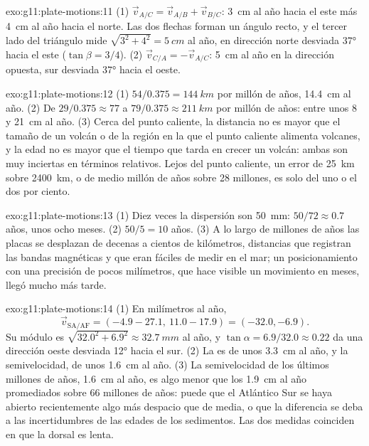 \begin{solution}{exo:g11:plate-motions:11}
(1) $\vec v_{A/C} = \vec v_{A/B} + \vec v_{B/C}$: \qty{3}{cm} al año hacia el
este más \qty{4}{cm} al año hacia el norte. Las dos flechas forman un ángulo
recto, y el tercer lado del triángulo mide $\sqrt{3^2 + 4^2} = \qty{5}{cm}$ al
año, en dirección norte desviada \ang{37} hacia el este ($\tan\beta = 3/4$).
(2) $\vec v_{C/A}
= -\vec v_{A/C}$: \qty{5}{cm} al año en la dirección opuesta, sur desviada
\ang{37} hacia el oeste.
\end{solution}

\begin{solution}{exo:g11:plate-motions:12}
(1) $54/0.375 = \qty{144}{km}$ por millón de años, \qty{14.4}{cm} al año. (2)
De $29/0.375 \approx 77$ a $79/0.375 \approx \qty{211}{km}$ por millón de
años: entre unos 8 y \qty{21}{cm} al año. (3) Cerca del punto caliente, la
distancia no es mayor que el tamaño de un volcán o de la región en la que el
punto caliente alimenta volcanes, y la edad no es mayor que el tiempo que
tarda en crecer un volcán: ambas son muy inciertas en términos relativos. Lejos
del punto caliente, un error de \qty{25}{km} sobre \qty{2400}{km}, o de medio
millón de años sobre 28 millones, es solo del uno o el dos por ciento.
\end{solution}

\begin{solution}{exo:g11:plate-motions:13}
(1) Diez veces la dispersión son \qty{50}{mm}: $50/72 \approx 0.7$ años, unos
ocho meses. (2) $50/5 = 10$ años. (3) A lo largo de millones de años las
placas se desplazan de decenas a cientos de kilómetros, distancias que
registran las bandas magnéticas y que eran fáciles de medir en el mar; un
posicionamiento con una precisión de pocos milímetros, que hace visible un
movimiento en meses, llegó mucho más tarde.
\end{solution}

\begin{solution}{exo:g11:plate-motions:14}
(1) En milímetros al año,
\[
  \vec v_{\mathrm{SA/AF}} = (-4.9 - 27.1,\ 11.0 - 17.9) = (-32.0, -6.9).
\] Su módulo es $\sqrt{32.0^2 + 6.9^2} \approx
\qty{32.7}{mm}$ al año, y $\tan\alpha = 6.9/32.0 \approx 0.22$ da una
dirección oeste desviada \ang{12} hacia el sur. (2) La  es de unos \qty{3.3}{cm} al año, y la semivelocidad, de unos
\qty{1.6}{cm} al año. (3) La semivelocidad de los últimos millones de años,
\qty{1.6}{cm} al año, es algo menor que los \qty{1.9}{cm} al año promediados
sobre 66 millones de años: puede que el Atlántico Sur se haya abierto
recientemente algo más despacio que de media, o que la diferencia se deba a
las incertidumbres de las edades de los sedimentos. Las dos medidas coinciden
en que la dorsal es lenta.
\end{solution}

